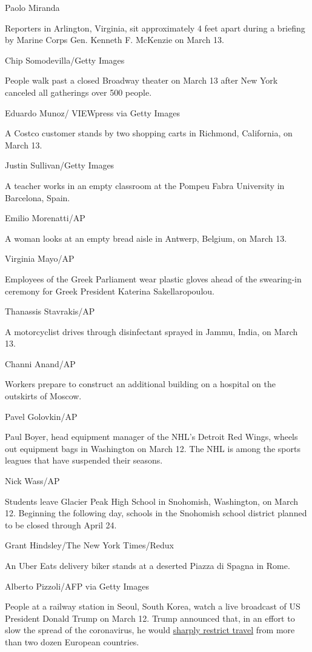 Paolo Miranda

Reporters in Arlington, Virginia, sit approximately 4 feet apart during
a briefing by Marine Corps Gen. Kenneth F. McKenzie on March 13.

Chip Somodevilla/Getty Images

People walk past a closed Broadway theater on March 13 after New York
canceled all gatherings over 500 people.

Eduardo Munoz/ VIEWpress via Getty Images

A Costco customer stands by two shopping carts in Richmond, California,
on March 13.

Justin Sullivan/Getty Images

A teacher works in an empty classroom at the Pompeu Fabra University in
Barcelona, Spain.

Emilio Morenatti/AP

A woman looks at an empty bread aisle in Antwerp, Belgium, on March 13.

Virginia Mayo/AP

Employees of the Greek Parliament wear plastic gloves ahead of the
swearing-in ceremony for Greek President Katerina Sakellaropoulou.

Thanassis Stavrakis/AP

A motorcyclist drives through disinfectant sprayed in Jammu, India, on
March 13.

Channi Anand/AP

Workers prepare to construct an additional building on a hospital on the
outskirts of Moscow.

Pavel Golovkin/AP

Paul Boyer, head equipment manager of the NHL's Detroit Red Wings,
wheels out equipment bags in Washington on March 12. The NHL is among
the sports leagues that have suspended their seasons.

Nick Wass/AP

Students leave Glacier Peak High School in Snohomish, Washington, on
March 12. Beginning the following day, schools in the Snohomish school
district planned to be closed through April 24.

Grant Hindsley/The New York Times/Redux

An Uber Eats delivery biker stands at a deserted Piazza di Spagna in
Rome.

Alberto Pizzoli/AFP via Getty Images

People at a railway station in Seoul, South Korea, watch a live
broadcast of US President Donald Trump on March 12. Trump announced
that, in an effort to slow the spread of the coronavirus, he would
\href{https://www.cnn.com/2020/03/11/politics/donald-trump-coronavirus-statement/index.html}{sharply
restrict travel} from more than two dozen European countries.


